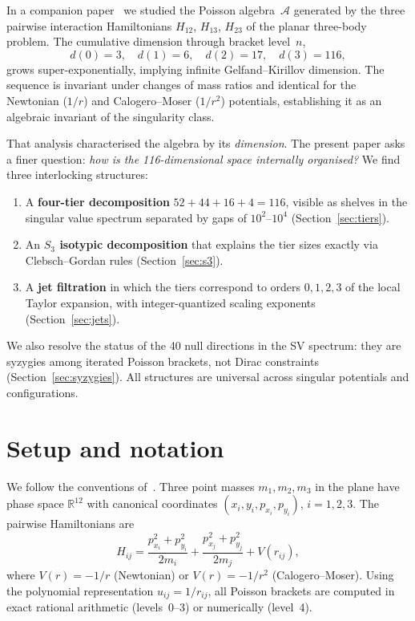 \documentclass[11pt,a4paper]{article}
\theoremstyle{remark}
\newcommand{\R}{\mathbb{R}}
\newcommand{\cA}{\mathcal{A}}
\newcommand{\SG}{S_3}
\begin{document}
In a companion paper~\cite{paper1} we studied the Poisson
algebra~$\cA$ generated by the three pairwise interaction
Hamiltonians $H_{12}$, $H_{13}$, $H_{23}$ of the planar
three-body problem.  The cumulative dimension through
bracket level~$n$,
\[
  d(0) = 3,\quad d(1) = 6,\quad d(2) = 17,\quad d(3) = 116,
\]
grows super-exponentially, implying infinite
Gelfand--Kirillov dimension.  The sequence is invariant
under changes of mass ratios and identical for the
Newtonian ($1/r$) and Calogero--Moser ($1/r^2$) potentials,
establishing it as an algebraic invariant of the singularity
class.

That analysis characterised the algebra by its
\emph{dimension}.  The present paper asks a finer question:
\emph{how is the 116-dimensional space internally
organised?}  We find three interlocking structures:

\begin{enumerate}[nosep]
  \item A \textbf{four-tier decomposition}
    $52 + 44 + 16 + 4 = 116$, visible as shelves in the
    singular value spectrum separated by gaps of
    $10^{2}$--$10^{4}$ (Section~\ref{sec:tiers}).
  \item An \textbf{$\SG$ isotypic decomposition} that
    explains the tier sizes exactly via Clebsch--Gordan
    rules (Section~\ref{sec:s3}).
  \item A \textbf{jet filtration} in which the tiers
    correspond to orders $0,1,2,3$ of the local Taylor
    expansion, with integer-quantized scaling exponents
    (Section~\ref{sec:jets}).
\end{enumerate}

We also resolve the status of the 40 null directions in
the SV spectrum: they are syzygies among iterated Poisson
brackets, not Dirac constraints
(Section~\ref{sec:syzygies}).  All structures are
universal across singular potentials and configurations.


\section{Setup and notation}
\label{sec:setup}

We follow the conventions of~\cite{paper1}.  Three point
masses $m_1, m_2, m_3$ in the plane have phase space
$\R^{12}$ with canonical coordinates
$(x_i, y_i, p_{x_i}, p_{y_i})$, $i = 1,2,3$.  The pairwise
Hamiltonians are
\[
  H_{ij} = \frac{p_{x_i}^2 + p_{y_i}^2}{2m_i}
          + \frac{p_{x_j}^2 + p_{y_j}^2}{2m_j}
          + V(r_{ij}),
\]
where $V(r) = -1/r$ (Newtonian) or $V(r) = -1/r^2$
(Calogero--Moser).  Using the polynomial representation
$u_{ij} = 1/r_{ij}$, all Poisson brackets are computed
in exact rational arithmetic (levels~0--3) or numerically
(level~4).
\end{document}
